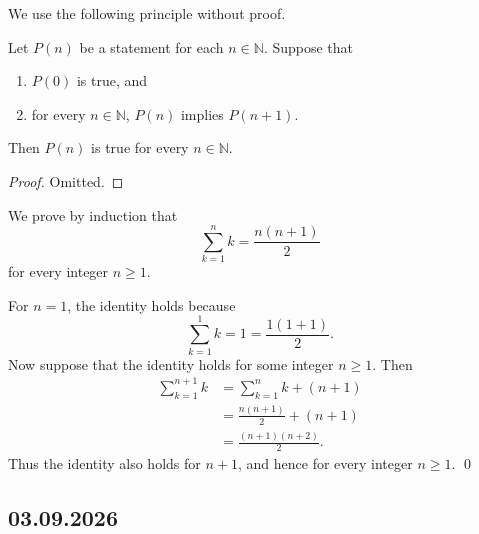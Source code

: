 \documentclass[12pt,a4paper]{article}
\begin{document}
We use the following principle without proof.

\begin{theorem}
  Let \(P(n)\) be a statement for each \(n \in \mathbb{N}\). Suppose that
  \begin{enumerate}
    \item \(P(0)\) is true, and
    \item for every \(n \in \mathbb{N}\), \(P(n)\) implies \(P(n+1)\).
  \end{enumerate}
  Then \(P(n)\) is true for every \(n \in \mathbb{N}\).
\end{theorem}

\begin{proof}
  Omitted.
\end{proof}

\begin{example}
  We prove by induction that
  \[
    \sum_{k=1}^{n} k = \frac{n(n+1)}{2}
  \]
  for every integer \(n \geq 1\).

  For \(n=1\), the identity holds because
  \[
    \sum_{k=1}^{1} k = 1 = \frac{1(1+1)}{2}.
  \]
  Now suppose that the identity holds for some integer \(n \geq 1\). Then
  \begin{align*}
    \sum_{k=1}^{n+1} k
    &= \sum_{k=1}^{n} k + (n+1) \\
    &= \frac{n(n+1)}{2} + (n+1) \\
    &= \frac{(n+1)(n+2)}{2}.
  \end{align*}
  Thus the identity also holds for \(n+1\), and hence for every integer
  \(n \geq 1\). \qed
\end{example}

\subsection{03.09.2026}
\end{document}
